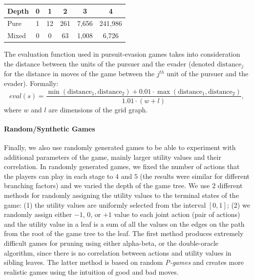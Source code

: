 \vspace{0.1cm}

\begin{center}
\small
\begin{tabular}{|l|c|c|c|c|c|}
\hline Depth & 0 & 1 & 2 & 3 & 4 \\
\hline Pure  & 1 & 12 & 261 & 7,656 & 241,986 \\
\hline Mixed & 0 & 0 & 63 & 1,008 & 6,726 \\
\hline
\end{tabular}
\end{center}

\vspace{0.1cm}

The evaluation function used in pursuit-evasion games takes into consideration the distance between the units of the pursuer and the evader (denoted $\textrm{distance}_j$ for the distance in moves of the game between the $j^{th}$ unit of the pursuer and the evader). Formally:
$$
eval(s) = \frac{\min(\textrm{distance}_1,\textrm{distance}_2) + 0.01\cdot\max(\textrm{distance}_1,\textrm{distance}_2)}{1.01 \cdot (w+l)},
$$
where $w$ and $l$ are dimensions of the grid graph.

\paragraph{\textbf{Random/Synthetic Games}}
Finally, we also use randomly generated games to be able to experiment with additional parameters of the game, mainly larger utility values and their correlation.
In randomly generated games, we fixed the number of actions that the players can play in each stage to $4$ and $5$ (the results were similar for different branching factors) and we varied the depth of the game tree.
We use $2$ different methods for randomly assigning the utility values to the terminal states of the game:
(1) the utility values are uniformly selected from the interval $\left[0,1\right]$;
(2) we randomly assign either $-1$, $0$, or $+1$ value to each joint action (pair of actions) and the utility value in a leaf is a sum of all the values on the edges on the path from the root of the game tree to the leaf.
The first method produces extremely difficult games for pruning using either alpha-beta, or the double-oracle algorithm, since there is no correlation between actions and utility values in sibling leaves.
The latter method is based on random \emph{P-games} \cite{smith1995} and creates more realistic games using the intuition of good and bad moves.

